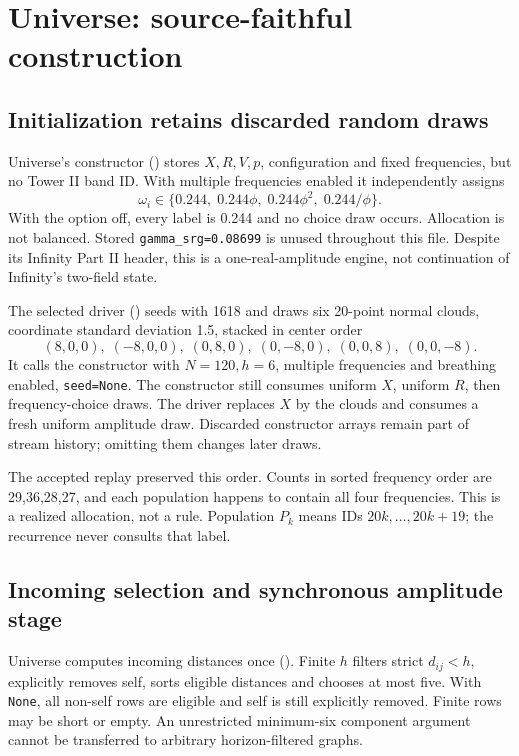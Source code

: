 \section{Universe: source-faithful construction}\label{sec:universe}
\subsection{Initialization retains discarded random draws}
Universe's constructor () stores \(X,R,V,p\), configuration and fixed frequencies, but no Tower II band ID. With multiple frequencies enabled it independently assigns
\begin{equation}\label{eq:Ufreq}
\omega_i\in\{0.244,\;0.244\phi,\;0.244\phi^2,\;0.244/\phi\}.
\end{equation}
With the option off, every label is 0.244 and no choice draw occurs. Allocation is not balanced. Stored \texttt{gamma\_srg=0.08699} is unused throughout this file. Despite its Infinity Part II header, this is a one-real-amplitude engine, not continuation of Infinity's two-field state.

The selected driver () seeds with 1618 and draws six 20-point normal clouds, coordinate standard deviation 1.5, stacked in center order
\[
(8,0,0),\;(-8,0,0),\;(0,8,0),\;(0,-8,0),\;(0,0,8),\;(0,0,-8).
\]
It calls the constructor with \(N=120,h=6\), multiple frequencies and breathing enabled, \texttt{seed=None}. The constructor still consumes uniform \(X\), uniform \(R\), then frequency-choice draws. The driver replaces \(X\) by the clouds and consumes a fresh uniform amplitude draw. Discarded constructor arrays remain part of stream history; omitting them changes later draws.

The accepted replay preserved this order. Counts in sorted frequency order are 29,36,28,27, and each population happens to contain all four frequencies. This is a realized allocation, not a rule. Population \(P_k\) means IDs \(20k,\ldots,20k+19\); the recurrence never consults that label.

\subsection{Incoming selection and synchronous amplitude stage}
Universe computes incoming distances once (). Finite \(h\) filters strict \(d_{ij}<h\), explicitly removes self, sorts eligible distances and chooses at most five. With \texttt{None}, all non-self rows are eligible and self is still explicitly removed. Finite rows may be short or empty. An unrestricted minimum-six component argument cannot be transferred to arbitrary horizon-filtered graphs.

